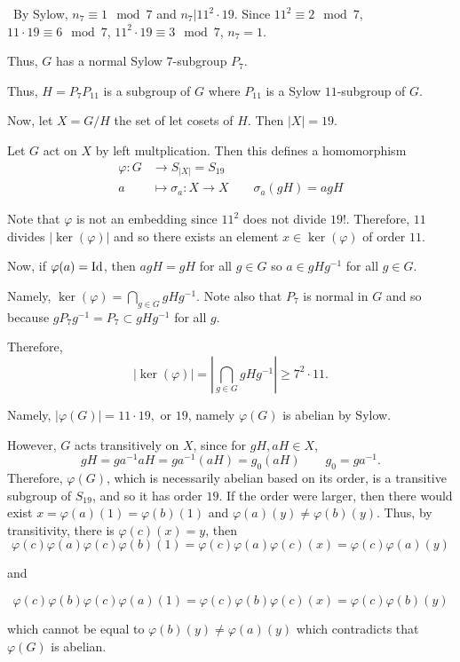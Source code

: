 \documentclass[12pt]{AlgebraQual}
\begin{document}
\begin{solution}$\,$
By Sylow, $n_7\equiv 1\mod 7$ and $n_7|11^2\cdot 19$. Since $11^2\equiv 2\mod 7$, $11\cdot 19\equiv 6 \mod 7$, $11^2\cdot 19\equiv 3\mod 7$, $n_7=1$.

Thus, $G$ has a normal Sylow $7$-subgroup $P_7$.

Thus, $H=P_7P_{11}$ is a subgroup of $G$ where $P_{11}$ is a Sylow $11$-subgroup of $G.$

Now, let $X=G/H$ the set of let cosets of $H$. Then $|X|=19$.

Let $G$ act on $X$ by left multplication. Then this defines a homomorphism \begin{align*}
    \varphi:G&\to S_{|X|}=S_{19}\\
    a&\mapsto \sigma_a:X\to X\qquad \sigma_a(gH)=agH
\end{align*}

Note that $\varphi$ is not an embedding since $11^2$ does not divide $19!$. Therefore, $11$ divides $|\ker(\varphi)|$ and so there exists an element $x\in\ker(\varphi)$ of order $11$.

Now, if $\varphi(a)=\text{Id}$, then $agH=gH$ for all $g\in G$ so $a\in gHg^{-1}$ for all $g\in G.$

Namely, $\displaystyle \ker(\varphi)=\bigcap_{g\in G}gHg^{-1}$. Note also that $P_7$ is normal in $G$ and so because $gP_7g^{-1}=P_7\subset gHg^{-1}$ for all $g.$

Therefore, $$|\ker(\varphi)|=\left|\bigcap_{g\in G}gHg^{-1}\right|\ge 7^2\cdot 11.$$

Namely, $|\varphi(G)|=11\cdot 19,$ or $19$, namely $\varphi(G)$ is abelian by Sylow.

However, $G$ acts transitively on $X$, since for $gH,aH\in X$, $$gH=ga^{-1}aH=ga^{-1}(aH)=g_0(aH)\qquad g_0=ga^{-1}.$$ Therefore, $\varphi(G)$, which is necessarily abelian based on its order, is a transitive subgroup of $S_{19}$, and so it has order $19$. If the order were larger, then there would exist $x=\varphi(a)(1)=\varphi(b)(1)$ and $\varphi(a)(y)\not=\varphi(b)(y)$. Thus, by transitivity, there is $\varphi(c)(x)=y$, then $$\varphi(c)\varphi(a)\varphi(c)\varphi(b)(1)=\varphi(c)\varphi(a)\varphi(c)(x)=\varphi(c)\varphi(a)(y)$$

and

$$\varphi(c)\varphi(b)\varphi(c)\varphi(a)(1)=\varphi(c)\varphi(b)\varphi(c)(x)=\varphi(c)\varphi(b)(y)$$

which cannot be equal to $\varphi(b)(y)\not=\varphi(a)(y)$ which contradicts that $\varphi(G)$ is abelian.


\end{solution}
\end{document}
